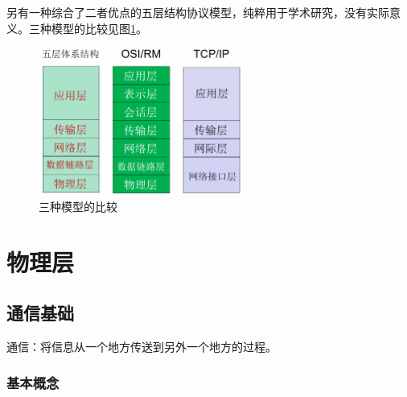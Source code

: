 \documentclass[12pt, a4paper, oneside]{ctexart}
\begin{document}
另有一种综合了二者优点的五层结构协议模型，纯粹用于学术研究，没有实际意义。三种模型的比较见图\ref{compare_of_three_architectures}。

\begin{figure}
    \centering
    \includegraphics[width=0.6\textwidth]{./images/compare_of_three_architectures.png}
    \caption{三种模型的比较}
    \label{compare_of_three_architectures}
\end{figure}

\section{物理层}

\subsection{通信基础}

通信：将信息从一个地方传送到另外一个地方的过程。

\subsubsection{基本概念}
\end{document}
